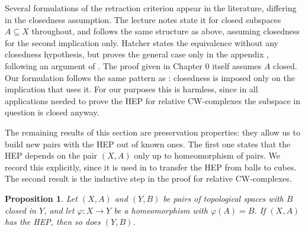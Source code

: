 \documentclass[11pt, a4paper, english]{article}
\theoremstyle{plain}
\newtheorem{proposition}[theorem]{Proposition}
\theoremstyle{definition}
\theoremstyle{remark}
\numberwithin{equation}{section}
\numberwithin{theorem}{section}
\begin{document}
Several formulations of the retraction criterion appear in the literature, differing in the closedness assumption. The lecture notes state it for closed subspaces $A \subseteq X$ throughout, and \cite{Tammo} follows the same structure as above, assuming closedness for the second implication only. Hatcher \cite[Chapter 0]{HAT01} states the equivalence without any closedness hypothesis, but proves the general case only in the appendix \cite[Appendix]{HAT01}, following an argument of \cite{STM}. The proof given in Chapter 0 itself assumes $A$ closed. \\
Our formulation follows the same pattern as : closedness is imposed only on the implication that uses it. For our purposes this is harmless, since in all applications needed to prove the HEP for relative CW-complexes the subspace in question is closed anyway.

The remaining results of this section are preservation properties: they allow us to build new pairs with the HEP out of known ones. The first one states that the HEP depends on the pair $(X,A)$ only up to homeomorphism of pairs. We record this explicitly, since it is used in  to transfer the HEP from balls to cubes. The second result is the inductive step in the proof for relative CW-complexes.

\begin{proposition} \label{prop:HEPhomeo}
    Let $(X,A)$ and $(Y,B)$ be pairs of topological spaces with $B$ closed in $Y$, and let $\varphi \colon X \to Y$ be a homeomorphism with $\varphi(A) = B$. If $(X,A)$ has the HEP, then so does $(Y,B)$.
\end{proposition}
\end{document}
